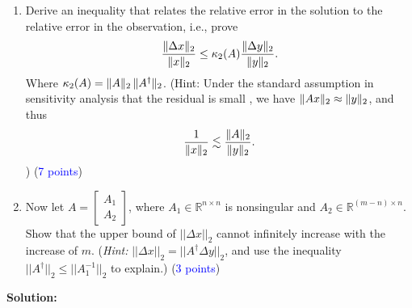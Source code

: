 \documentclass[english,onecolumn]{IEEEtran}
\DeclarePairedDelimiter{\norm}{\lVert}{\rVert}
\newcommand{\0}{{\mathbf{0}}} %
\begin{document}
\begin{enumerate}
    \item Derive an inequality that relates the relative error in the solution to the relative error in the observation, i.e., prove $$
\frac{\norm{\Delta x}_2}{\norm{x}_2}
\leq  \kappa_2(A) \frac{\norm{\Delta y}_2}{\norm{y}_2}. $$
Where $\kappa_2(A)=\norm{A}_2 \, \norm{A^\dagger}_2 $. (Hint: Under the standard assumption in sensitivity analysis that the residual is small , we have $\norm{Ax}_2 \approx \norm{y}_2$, and thus
\[
\frac{1}{\norm{x}_2} \lesssim \frac{\norm{A}_2}{\norm{y}_2}.
\]) (\textcolor{blue}{7 points})
    \item Now let $A = \begin{bmatrix} A_1 \\ A_2 \end{bmatrix}$, where $A_1\in\mathbb{R}^{n\times n}$ is nonsingular and $A_2\in\mathbb{R}^{(m-n)\times n}$. Show that the upper bound of $||\Delta x||_2$ cannot infinitely increase with the increase of $m$. (\textit{Hint:}  $||\Delta x||_2=||A^{\dagger}\Delta y||_2$, and use the inequality $||A^\dagger||_2\le ||A_1^{-1}||_2$ to explain.) (\textcolor{blue}{3 points})
\end{enumerate}

\bigskip

\noindent \textbf{Solution:}
\end{document}

